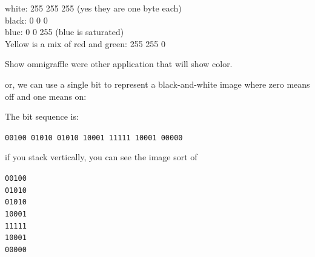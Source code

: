\begin{fullwidth}
white: 255 255 255  (yes they are one byte each) \\
black: 0 0 0\\
blue: 0 0 255 (blue is saturated)\\
Yellow is a mix of red and green: 255 255 0

Show omnigraffle were other application that will show color.

or, we can use a single bit to represent a black-and-white image where zero means off and one means on:


The bit sequence is:

{\tt 00100 01010 01010 10001 11111 10001 00000}

if you stack vertically, you can see the image sort of

{\tt 00100\\
     01010 \\
     01010 \\
     10001 \\
     11111 \\
     10001 \\
     00000}


\end{fullwidth}
